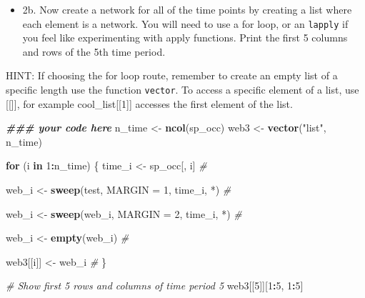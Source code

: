 \documentclass[
]{article}
\newenvironment{Shaded}{\begin{snugshade}}{\end{snugshade}}
\newcommand{\AttributeTok}[1]{\textcolor[rgb]{0.13,0.29,0.53}{#1}}
\newcommand{\CommentTok}[1]{\textcolor[rgb]{0.56,0.35,0.01}{\textit{#1}}}
\newcommand{\ControlFlowTok}[1]{\textcolor[rgb]{0.13,0.29,0.53}{\textbf{#1}}}
\newcommand{\DecValTok}[1]{\textcolor[rgb]{0.00,0.00,0.81}{#1}}
\newcommand{\DocumentationTok}[1]{\textcolor[rgb]{0.56,0.35,0.01}{\textbf{\textit{#1}}}}
\newcommand{\FunctionTok}[1]{\textcolor[rgb]{0.13,0.29,0.53}{\textbf{#1}}}
\newcommand{\NormalTok}[1]{#1}
\newcommand{\OtherTok}[1]{\textcolor[rgb]{0.56,0.35,0.01}{#1}}
\newcommand{\SpecialCharTok}[1]{\textcolor[rgb]{0.81,0.36,0.00}{\textbf{#1}}}
\newcommand{\StringTok}[1]{\textcolor[rgb]{0.31,0.60,0.02}{#1}}
\providecommand{\tightlist}{%
  \setlength{\itemsep}{0pt}\setlength{\parskip}{0pt}}
\begin{document}
\begin{itemize}
\tightlist
\item
  2b. Now create a network for all of the time points by creating a list
  where each element is a network. You will need to use a for loop, or
  an \texttt{lapply} if you feel like experimenting with apply
  functions. Print the first 5 columns and rows of the 5th time period.
\end{itemize}

HINT: If choosing the for loop route, remember to create an empty list
of a specific length use the function \texttt{vector}. To access a
specific element of a list, use {[}{[}{]}{]}, for example
cool\_list{[}{[}1{]}{]} accesses the first element of the list.

\begin{Shaded}
\begin{Highlighting}[]
\DocumentationTok{\#\#\#  your code here}
\NormalTok{n\_time }\OtherTok{\textless{}{-}} \FunctionTok{ncol}\NormalTok{(sp\_occ)}
\NormalTok{web3 }\OtherTok{\textless{}{-}} \FunctionTok{vector}\NormalTok{(}\StringTok{"list"}\NormalTok{, n\_time)}

\ControlFlowTok{for}\NormalTok{ (i }\ControlFlowTok{in} \DecValTok{1}\SpecialCharTok{:}\NormalTok{n\_time) \{}
\NormalTok{  time\_i }\OtherTok{\textless{}{-}}\NormalTok{ sp\_occ[, i]                       }\CommentTok{\# }
  
\NormalTok{  web\_i }\OtherTok{\textless{}{-}} \FunctionTok{sweep}\NormalTok{(test, }\AttributeTok{MARGIN =} \DecValTok{1}\NormalTok{, time\_i, }\StringTok{\textasciigrave{}}\AttributeTok{*}\StringTok{\textasciigrave{}}\NormalTok{)  }\CommentTok{\# }
  
\NormalTok{  web\_i }\OtherTok{\textless{}{-}} \FunctionTok{sweep}\NormalTok{(web\_i, }\AttributeTok{MARGIN =} \DecValTok{2}\NormalTok{, time\_i, }\StringTok{\textasciigrave{}}\AttributeTok{*}\StringTok{\textasciigrave{}}\NormalTok{)  }\CommentTok{\# }

\NormalTok{web\_i }\OtherTok{\textless{}{-}} \FunctionTok{empty}\NormalTok{(web\_i)                          }\CommentTok{\# }

\NormalTok{  web3[[i]] }\OtherTok{\textless{}{-}}\NormalTok{ web\_i                             }\CommentTok{\# }
\NormalTok{\}}

\CommentTok{\# Show first 5 rows and columns of time period 5}
\NormalTok{web3[[}\DecValTok{5}\NormalTok{]][}\DecValTok{1}\SpecialCharTok{:}\DecValTok{5}\NormalTok{, }\DecValTok{1}\SpecialCharTok{:}\DecValTok{5}\NormalTok{]}
\end{Highlighting}
\end{Shaded}
\end{document}
